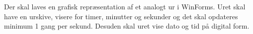 Der skal laves en grafisk repræsentation af et analogt ur i WinForms. Uret skal have en urskive, visere for timer, minutter og sekunder og det skal opdateres minimum 1 gang per sekund. Desuden skal uret vise dato og tid på digital form.
